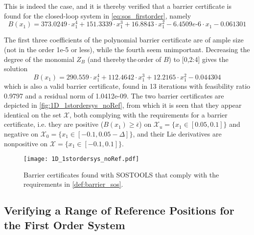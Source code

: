 \vspace{-2mm}
This is indeed the case, and it is thereby verified that a barrier certificate is found for the closed-loop system in \autoref{eq:sos_firstorder}, namely
\vspace{-2mm}
\begin{equation}
B(x_1) = 373.0249\cdot x_1^4 + 151.3339\cdot x_1^3 + 16.8843\cdot x_1^2 - 6.4509e\text{-}6\cdot x_1 - 0.061301
\end{equation}

\vspace{-3mm}
The first three coefficients of the polynomial barrier certificate are of ample size (not in the order 1e-5 or less), while the fourth seem unimportant. Decreasing the degree of the monomial $Z_B$ (and thereby\,the\,order of $B$) to [0,2:4] %
gives the solution
\begin{equation}
B(x_1) = 290.559\cdot x_1^4 + 112.4642\cdot x_1^3 + 12.2165\cdot x_1^2 - 0.044304
\end{equation}
which is also a valid barrier certificate, found in 13 iterations with feasibility ratio 0.9797 and a residual norm of 1.0412e-09.
The two barrier certificates are depicted in \autoref{fig:1D_1stordersys_noRef}, from which it is seen that they appear identical on the set $\mathcal{X}$, both complying with the requirements for a barrier certificate, i.e. they are positive ($B(x_1)\geq \bar{\epsilon}$) on $\mathcal{X}_u=\{x_1\in [0.05,0.1]\}$ and negative on $\mathcal{X}_0=\{x_1\in [-0.1,0.05-\Delta]\}$, and their Lie derivatives are nonpositive on $\mathcal{X}=\{x_1\in [-0.1,0.1]\}$.

\begin{figure}[htbp]
\centering%
\texttt{[image: 1D\_1stordersys\_noRef.pdf]}
	\caption{Barrier certificates found with SOSTOOLS that comply with the requirements in \autoref{def:barrier_sos}. }
	\label{fig:1D_1stordersys_noRef}
\end{figure}












\subsection{Verifying a Range of Reference Positions for the First Order System}\label{sec:sos_1storder_references}


